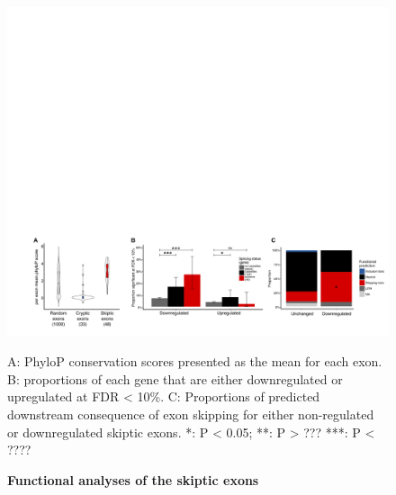 \begin{figure}[h!]
	\begin{center}
		\includegraphics[width=18cm]{Figures/05_tdp_mice/functional_plots.png}
	\end{center}
	\label{functional_plots}
	\caption{\textbf{Functional analyses of the skiptic exons}}
	A: PhyloP conservation scores presented as the mean for each exon. B: proportions of each gene that are either downregulated or upregulated at FDR < 10\%. C: Proportions of predicted downstream consequence of exon skipping for either non-regulated or downregulated skiptic exons. *: P < 0.05; **: P > ??? ***: P < ????
\end{figure}


